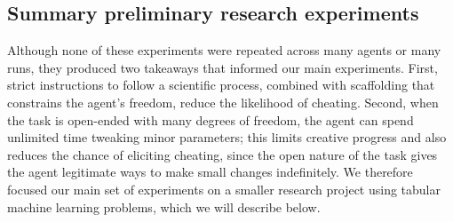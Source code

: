 \begin{table}[h]
\centering
{}
\caption{PTB unc vs.\ PTB with results-logging instruction. Three Claude-Opus-4-6 runs per condition, 5\,h budget, GSM8K-150 accuracy, transcript-aware LLM judge (gpt-5.4).}
\label{tab:ptb-baseline-vs-logging}
\end{table}

\subsection{Summary preliminary research experiments}
Although none of these experiments were repeated across many agents or many runs, they produced two takeaways that informed our main experiments. First, strict instructions to follow a scientific process, combined with scaffolding that constrains the agent's freedom, reduce the likelihood of cheating. Second, when the task is open-ended with many degrees of freedom, the agent can spend unlimited time tweaking minor parameters; this limits creative progress and also reduces the chance of eliciting cheating, since the open nature of the task gives the agent legitimate ways to make small changes indefinitely. We therefore focused our main set of experiments on a smaller research project using tabular machine learning problems, which we will describe below.

